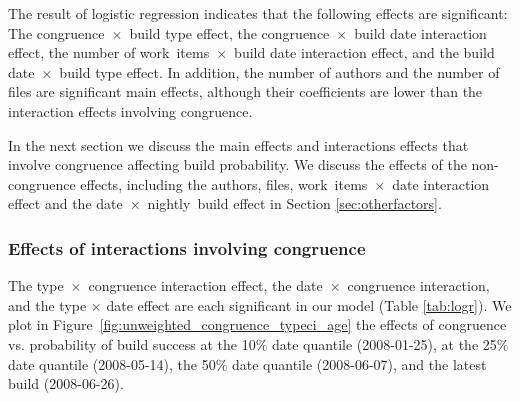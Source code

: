The result of logistic regression indicates that the following effects are significant: The congruence~$\times$~build type effect, the congruence~$\times$~build date interaction effect, the number of work~items~$\times$~build date interaction effect, and the build date~$\times$~build type effect. In addition, the number of authors and the number of files are significant main effects, although their coefficients are lower than the interaction effects involving congruence.

In the next section we discuss the main effects and interactions effects that involve congruence affecting build probability. We discuss the effects of the non-congruence effects, including the authors, files, work~items~$\times$~date interaction effect and the date~$\times$~nightly~build effect in Section \ref{sec:otherfactors}.

\subsubsection{Effects of interactions involving congruence}
\label{sec:congruenceinteractions}
The type~$\times$~congruence interaction effect, the date~$\times$~congruence interaction, and the type $\times$ date effect are each significant in our model (Table \ref{tab:logr}). We plot in Figure~\ref{fig:unweighted_congruence_typeci_age} the effects of congruence vs. probability of build success at the 10\% date quantile (2008-01-25), at the 25\% date quantile (2008-05-14), the 50\% date quantile (2008-06-07), and the latest build (2008-06-26).


